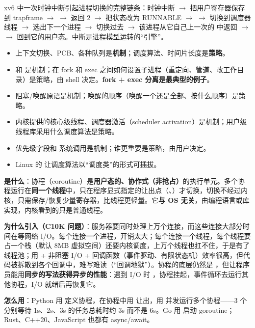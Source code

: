 xv6 中一次时钟中断引起进程切换的完整链条：时钟中断 $\to$  把用户寄存器保存到 trapframe $\to$  $\to$  返回 2 $\to$  把状态改为 RUNNABLE $\to$  $\to$  切换到调度器线程 $\to$  选出下一个进程 $\to$  切换过去 $\to$ 该进程从它自己上一次的  中返回 $\to$  $\to$  回到它的用户态。中断是进程模型运转的“引擎”。

\begin{itemize}
    \item 上下文切换、PCB、各种队列是\textbf{机制}；调度算法、时间片长度是\textbf{策略}。
    \item {} 和  是机制；在 fork 和 exec 之间如何设置子进程（重定向、管道、改工作目录）是策略，由 shell 决定。\textbf{fork + exec 分离是最典型的例子}。
    \item 阻塞/唤醒原语是机制；唤醒的顺序（唤醒一个还是全部、按什么顺序）是策略。
    \item 内核提供的核心级线程、调度器激活（scheduler activation）是机制；用户级线程库采用什么调度算法是策略。
    \item 优先级字段和  系统调用是机制；谁更重要是策略，由用户决定。
    \item Linux 的  让调度算法以“调度类”的形式可插拔。
\end{itemize}

\textbf{是什么}：协程（coroutine）是\textbf{用户态的、协作式（非抢占）}的执行单元。多个协程运行在\textbf{同一个线程}中，只在程序显式指定的让出点（、）才切换，切换不经过内核，只需保存/恢复少量寄存器，比线程更轻量。它\textbf{与 OS 无关}，由编程语言或库实现，内核看到的只是普通线程。

\textbf{为什么引入（C10K 问题）}：服务器要同时处理上万个连接，而这些连接大部分时间在等网络 I/O。每个连接一个进程，开销太大；每个连接一个线程，每个线程要占一个栈（默认 8MB 虚拟空间）还要内核调度，上万个线程也扛不住，于是有了线程池；用  + 非阻塞 I/O + 回调函数（事件驱动、有限状态机）效率很高，但代码被拆散到各个回调中，难写难读（“回调地狱”）。协程的底层仍然是 ，但让程序员能用\textbf{同步的写法获得异步的性能}：遇到 I/O 时 ，协程挂起，事件循环去运行其他协程，I/O 就绪后再恢复它。

\textbf{怎么用}：Python 用  定义协程，在协程中用  让出，用  并发运行多个协程——3 个分别等待 1s、2s、3s 的任务总耗时约 3s 而不是 6s。Go 用  启动 goroutine；Rust、C++20、JavaScript 也都有 async/await。

